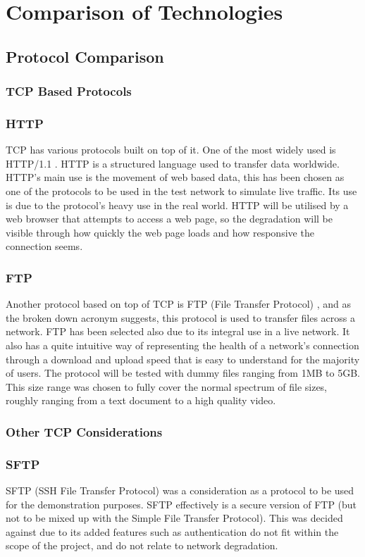 \section{Comparison of Technologies}
\subsection{Protocol Comparison}
\subsubsection{TCP Based Protocols}

\subsubsection*{HTTP}
TCP has various protocols built on top of it. One of the most widely used is HTTP/1.1 \citep{HTTP}. HTTP is a structured language used to transfer data worldwide. HTTP's main use is the movement of web based data, this has been chosen as one of the protocols to be used in the test network to simulate live traffic. Its use is due to the protocol's heavy use in the real world. HTTP will be utilised by a web browser that attempts to access a web page, so the degradation will be visible through how quickly the web page loads and how responsive the connection seems.

\subsubsection*{FTP}
Another protocol based on top of TCP is FTP (File Transfer Protocol) \citep{FTP}, and as the broken down acronym suggests, this protocol is used to transfer files across a network. FTP has been selected also due to its integral use in a live network. It also has a quite intuitive way of representing the health of a network's connection through a download and upload speed that is easy to understand for the majority of users. The protocol will be tested with dummy files ranging from 1MB to 5GB. This size range was chosen to fully cover the normal spectrum of file sizes, roughly ranging from a text document to a high quality video.

\subsubsection*{Other TCP Considerations}

\subsubsection*{SFTP}
SFTP (SSH File Transfer Protocol) \citep{SFTP} was a consideration as a protocol to be used for the demonstration purposes. SFTP effectively is a secure version of FTP (but not to be mixed up with the Simple File Transfer Protocol). This was decided against due to its added features such as authentication do	not fit within the scope of the project, and do not relate to network degradation. 

